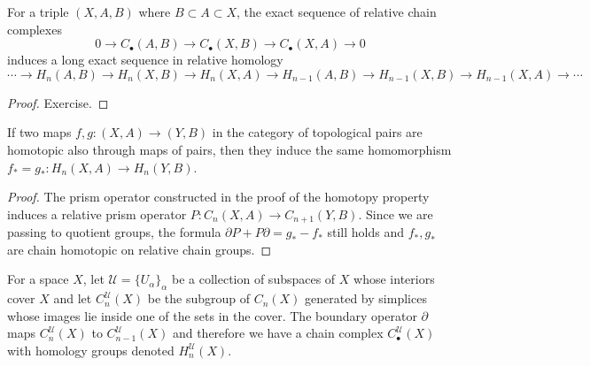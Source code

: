 \documentclass[english,letterpaper]{article}%
\numberwithin{equation}{section}
\numberwithin{figure}{section}
\numberwithin{table}{section}
\theoremstyle{definition}
\theoremstyle{definition}
\theoremstyle{definition}
\theoremstyle{plain}
\theoremstyle{plain}
\theoremstyle{plain}
\theoremstyle{plain}
\theoremstyle{remark}
\theoremstyle{remark}
\newcommand{\calU}{\mathcal{U}}
\begin{document}
\begin{prop}\label{exact sequence of a triple}
    For a triple $(X,A,B)$ where $B\subset A\subset X$, the exact sequence of relative chain complexes
    \[0\to C_\bullet(A,B)\to C_\bullet (X,B)\to C_\bullet(X,A)\to 0 \]
    induces a long exact sequence in relative homology
    \[\cdots \to H_n(A,B)\to H_n(X,B)\to H_n(X,A)\to H_{n-1}(A,B)\to H_{n-1}(X,B)\to H_{n-1}(X,A)\to \cdots\]
\end{prop}
\begin{proof}
     Exercise.
\end{proof}


\begin{prop}
    If two maps $f,g:(X,A)\to (Y,B)$ in the category of topological pairs are homotopic also through maps of pairs, then they induce the same homomorphism $f_\ast=g_\ast:H_n(X,A)\to H_n(Y,B)$.
\end{prop}
\begin{proof}
     The prism operator constructed in the proof of the homotopy property induces a relative prism operator $P:C_n(X,A)\to C_{n+1}(Y,B)$. Since we are passing to quotient groups, the formula $\partial P+P\partial=g_\ast-f_\ast$ still holds and $f_\ast,g_\ast$ are chain homotopic on relative chain groups. 
\end{proof}


For a space $X$, let $\calU=\{U_\alpha\}_\alpha$ be a collection of subspaces of $X$ whose interiors cover $X$ and let $C_n^\calU(X)$ be the subgroup of $C_n(X)$ generated by simplices whose images lie inside one of the sets in the cover. The boundary operator $\partial$ maps $C^\calU_n(X)$ to $C^\calU_{n-1}(X)$ and therefore we have a chain complex $C_\bullet^\calU(X)$ with homology groups denoted $H^\calU_n(X)$.
\end{document}
